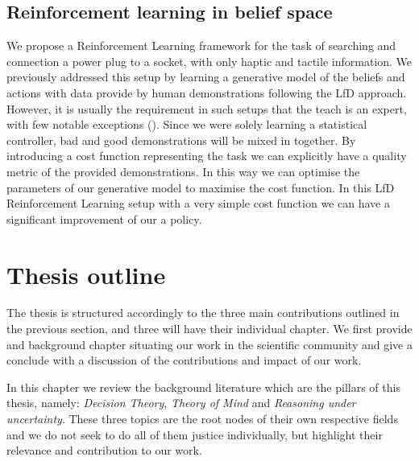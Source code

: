 \subsection{Reinforcement learning in belief space}

We propose a Reinforcement Learning framework for the task of searching and connection a power plug to a socket, with only haptic 
and tactile information. We previously addressed this setup by learning a generative model of the beliefs and actions with data 
provide by human demonstrations following the LfD approach. However, it is usually the requirement in such setups that 
the teach is an expert, with few notable exceptions (\cite{rai2013learning}). Since we were solely learning a 
statistical controller, bad and good demonstrations will be mixed in together. By introducing a cost function 
representing the task we can explicitly have a quality metric of the provided demonstrations. In this way 
we can optimise the parameters of our generative model to maximise the cost function. In this LfD Reinforcement 
Learning setup with a very simple cost function we can have a significant improvement of our a policy.

\section{Thesis outline}

The thesis is structured accordingly to the three main contributions outlined in the previous section, 
and three will have their individual chapter. We first provide and background chapter situating our work 
in the scientific community and give a conclude with a discussion of the contributions and impact of 
our work.

\begin{minipage}[c]{0.9\textwidth}
In this chapter we review the background literature which are the pillars of this 
thesis, namely: \textit{Decision Theory}, \textit{Theory of Mind} and \textit{Reasoning under uncertainty}. 
These three topics are the root nodes of their own respective fields and we do not seek to do all of them justice 
individually, but highlight their relevance and contribution to our work.
\end{minipage}

\begin{minipage}[c]{0.9\textwidth}
\end{minipage}


